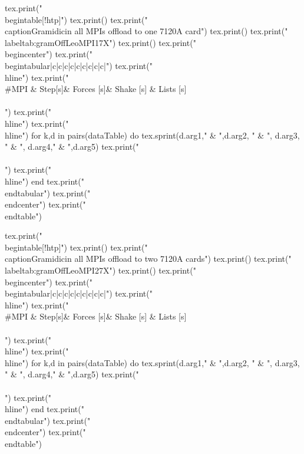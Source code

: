 %
\begin{luacode*}
  tex.print("\\begin{table}[!htp]")
  tex.print()
  tex.print("\\caption{Gramidicin all MPIs offload to one 7120A card}")
  tex.print()
  tex.print("\\label{tab:gramOffLeoMPI17X}")
  tex.print()
  tex.print("\\begin{center}")
  tex.print("\\begin{tabular}{|c|c|c|c|c|c|c|c|c|}")
  tex.print("\\hline")
  tex.print("\\#MPI & Step[s]& Forces [s]& Shake [s] & Lists [s]\\\\")
  tex.print("\\hline")
  tex.print("\\hline")
  for k,d in pairs(dataTable) do
    tex.sprint(d.arg1," & ",d.arg2, " & ", d.arg3, " & ", d.arg4," & ",d.arg5)
    tex.print(" \\\\")
    tex.print("\\hline")
  end
  tex.print("\\end{tabular}")
  tex.print("\\end{center}")
  tex.print("\\end{table}")
\end{luacode*}
\begin{luacode*}
  tex.print("\\begin{table}[!htp]")
  tex.print()
  tex.print("\\caption{Gramidicin all MPIs offload to two 7120A cards}")
  tex.print()
  tex.print("\\label{tab:gramOffLeoMPI27X}")
  tex.print()
  tex.print("\\begin{center}")
  tex.print("\\begin{tabular}{|c|c|c|c|c|c|c|c|c|}")
  tex.print("\\hline")
  tex.print("\\#MPI & Step[s]& Forces [s]& Shake [s] & Lists [s]\\\\")
  tex.print("\\hline")
  tex.print("\\hline")
  for k,d in pairs(dataTable) do
    tex.sprint(d.arg1," & ",d.arg2, " & ", d.arg3, " & ", d.arg4," & ",d.arg5)
    tex.print(" \\\\")
    tex.print("\\hline")
  end
  tex.print("\\end{tabular}")
  tex.print("\\end{center}")
  tex.print("\\end{table}")
\end{luacode*}

